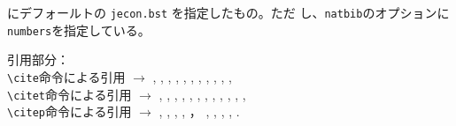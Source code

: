 \documentclass[10pt]{jarticle}
\begin{document}
\verb|| にデフォールトの \verb|jecon.bst| を指定したもの。ただ
し、\verb|natbib|のオプションに\verb|numbers|を指定している。
\vspace{1em}

引用部分：\\
\verb|\cite|命令による引用 $\rightarrow$ \cite{takeda06:_cge_analy_welfar_effec_trade},
\cite{imai72:_micr_2},
\cite{ishikawa03:_green_gas_emiss_contr_open_econom},
\cite{isikawa02jp:_env_trade},
\cite{krugman91:_is_bilat_bad},
\cite{krugman91:_geogr_trade},
\cite{brezis93:_leapf_inter_compet},
\cite{katayama2001},
\cite{fujita99jp:_spatial_econom},
\cite{somusho04jp:2000io-kaisetsu}, 
\cite{oyama99:_mark_stru},\\
\verb|\citet|命令による引用 $\rightarrow$ \citet{kuroda97jp:keo},
\citet{rutherford00:_gtapin_gtap_eg},
\citet{miyazawa02:_io_intr},
\citet{barro97jp},
\citet{ishikawa94:_revis_stolp_samuel_rybcz_theor_produc_exter},
\citet{markusen99jp:trade_vol_1},
\citet{kiyono93:_regu_comp_1},
\citet{brooke03:_gams},
\citet{ito85:_inte_trad},
\citet{lucas76:_econom_polic_evaluat},
\citet{wong95:_inter_trade_goods_factor_mobil_},
\citet{iwamoto91jp:haito-keika},\\
\verb|\citep|命令による引用 $\rightarrow$ \citep{nishimura90:_micr_econ},
\citep{wang89:_model_therm_hydrod_aspec_molten},
\citep{imai71:_micr_1},
\citep{milne-thomson68:_theor_hydrod},
\citep{2007yamasue482353}，
\citep{2009yamasue502165},
\citep{Takeda2012a}, \citep{arimura-takeda2012}, \citep{takeda2012_cge},
\citep{takeda2013jecon}.

\nocite{*}


% 


\end{document}
